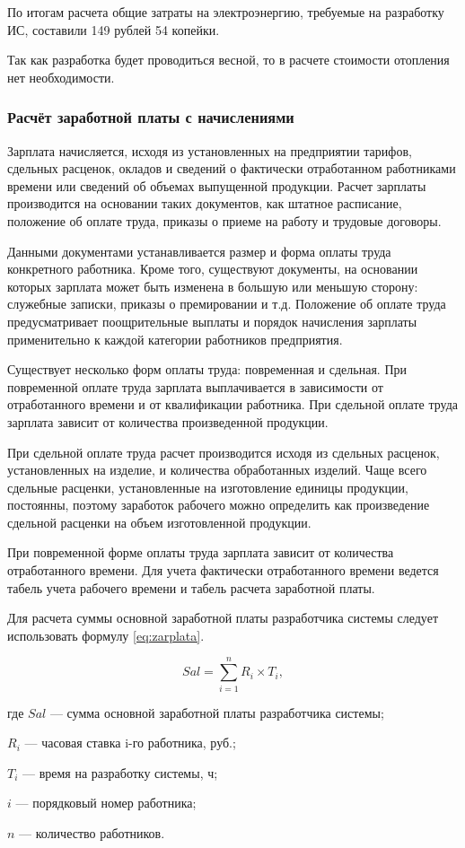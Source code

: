 По итогам расчета общие затраты на электроэнергию, требуемые на разработку ИС, составили 149 рублей 54 копейки.

Так как разработка будет проводиться весной, то в расчете стоимости отопления нет необходимости.

\subsubsection{Расчёт заработной платы с начислениями}

Зарплата начисляется, исходя из установленных на предприятии тарифов, сдельных расценок, окладов и сведений о фактически отработанном работниками времени или сведений об объемах выпущенной продукции.
Расчет зарплаты производится на основании таких документов, как штатное расписание, положение об оплате труда, приказы о приеме на работу и трудовые договоры.

Данными документами устанавливается размер и форма оплаты труда конкретного работника.
Кроме того, существуют документы, на основании которых зарплата может быть изменена в большую или меньшую сторону: служебные записки, приказы о премировании и т.д.
Положение об оплате труда предусматривает поощрительные выплаты и порядок начисления зарплаты применительно к каждой категории работников предприятия. 

Существует несколько форм оплаты труда: повременная и сдельная. При повременной оплате труда зарплата выплачивается в зависимости от отработанного времени и от квалификации работника.
При сдельной оплате труда зарплата зависит от количества произведенной продукции. 

При сдельной оплате труда расчет производится исходя из сдельных расценок, установленных на изделие, и количества обработанных изделий. Чаще всего сдельные расценки, установленные на изготовление единицы продукции, постоянны, поэтому заработок рабочего можно определить как произведение сдельной расценки на объем изготовленной продукции.

При повременной форме оплаты труда зарплата зависит от количества отработанного времени. Для учета фактически отработанного времени ведется табель учета рабочего времени и табель расчета заработной платы.

Для расчета суммы основной заработной платы разработчика системы следует использовать формулу \ref{eq:zarplata}. 

\begin{equation}
	\label{eq:zarplata}
	Sal =  \sum^{n}_{i=1} R_i \times T_i,
\end{equation}
\begin{ESKDexplanation}
	\item где $Sal$ --- сумма основной заработной платы разработчика системы;
	\item $R_i$ --- часовая ставка i-го работника, руб.;
	\item $T_{i}$ --- время на разработку системы, ч;
	\item $i$ --- порядковый номер работника;
	\item $n$ --- количество работников.
\end{ESKDexplanation}

